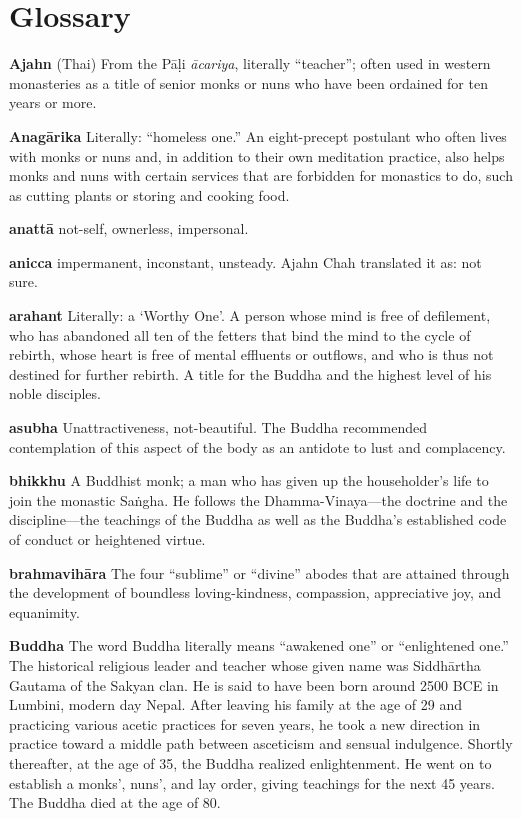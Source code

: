 \chapter{Glossary}

\textbf{Ajahn} (Thai) From the Pāḷi \emph{ācariya}, literally 
``teacher''; often used in western monasteries as a title of senior 
monks or nuns who have been ordained for ten years or more.

\textbf{Anagārika} Literally: ``homeless one.'' An eight-precept 
postulant who often lives with monks or nuns and, in addition to their 
own meditation practice, also helps monks and nuns with certain 
services that are forbidden for monastics to do, such as cutting plants 
or storing and cooking food.

\textbf{anattā} not-self, ownerless, impersonal.

\textbf{anicca} impermanent, inconstant, unsteady. Ajahn Chah 
translated it as: not sure.

\textbf{arahant} Literally: a `Worthy One'. A person whose mind is free 
of defilement, who has abandoned all ten of the fetters that bind the 
mind to the cycle of rebirth, whose heart is free of mental effluents 
or outflows, and who is thus not destined for further rebirth. A title 
for the Buddha and the highest level of his noble disciples.

\textbf{asubha} Unattractiveness, not-beautiful. The Buddha recommended 
contemplation of this aspect of the body as an antidote to lust and 
complacency.

\textbf{bhikkhu} A Buddhist monk; a man who has given up the 
householder's life to join the monastic Saṅgha. He follows the 
Dhamma-Vinaya---the doctrine and the discipline---the teachings of the 
Buddha as well as the Buddha's established code of conduct or 
heightened virtue.

\textbf{brahmavihāra} The four ``sublime'' or ``divine'' abodes that 
are attained through the development of boundless loving-kindness, 
compassion, appreciative joy, and equanimity.

\textbf{Buddha} The word Buddha literally means ``awakened one'' or 
``enlightened one.'' The historical religious leader and teacher whose 
given name was Siddhārtha Gautama of the Sakyan clan. He is said to 
have been born around 2500 BCE in Lumbini, modern day Nepal. After 
leaving his family at the age of 29 and practicing various acetic 
practices for seven years, he took a new direction in practice toward a 
middle path between asceticism and sensual indulgence. Shortly 
thereafter, at the age of 35, the Buddha realized enlightenment. He 
went on to establish a monks', nuns', and lay order, giving teachings 
for the next 45 years. The Buddha died at the age of 80.

